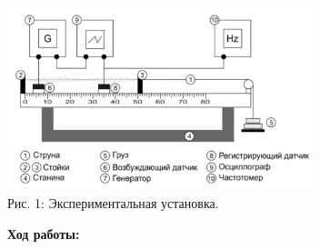 \documentclass[8pt]{article}
\begin{document}
    \begin{center} 
        \includegraphics[width=3.5in]{string_img.png} \\ Рис. 1: Экспериментальная установка.
    \end{center}
    
    \textbf{Ход работы:}\\
\end{document}
